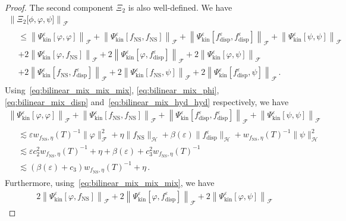 \documentclass[AHL,Unicode,longabstracts,published]{cedram}
\newcommand{\ns}{\mathrm{NS}}
\newcommand{\kin}{\mathrm{kin}}
\newcommand{\disp}{\mathrm{disp}}
\newcommand{\FFF}{\mathscr{F}}
\newcommand{\HHH}{\mathscr{H}}
\newcommand{\SSSs}{\HHH}
\newcommand{\SSSm}{\FFF}
\renewcommand*\le{\leqslant}
\newcommand*\eps{{\varepsilon}}
\begin{document}
\begin{proof}
The second component $\Xi_2$ is also well-defined. We have
\begin{multline*}
\left\| \Xi_2\big[\phi, \varphi, \psi\big] \right\|_{ \SSSm }\\
\begin{aligned}
&\le \left\| \Psi^\eps_\kin\left[\varphi, \varphi \right] \right\|_{ \SSSm } + \left\| \Psi^\eps_\kin\left[f_\ns, f_\ns \right] \right\|_{ \SSSm } + \left\| \Psi^\eps_\kin\left[f^\eps_\disp, f^\eps_\disp\right] \right\|_{ \SSSm }  + \left\| \Psi^\eps_\kin\left[\psi, \psi \right] \right\|_{ \SSSm } \\
& + 2 \left\| \Psi^\eps_\kin\left[\varphi, f_\ns \right] \right\|_{ \SSSm } + 2 \left\| \Psi^\eps_\kin\left[\varphi, f_\disp^\eps \right] \right\|_{ \SSSm } + 2 \left\| \Psi^\eps_\kin\left[\varphi, \psi \right] \right\|_{ \SSSm } \\
& + 2 \left\| \Psi^\eps_\kin\left[f_\ns, f^\eps_\disp \right] \right\|_{ \SSSm } + 2 \left\| \Psi^\eps_\kin\left[f_\ns, \psi \right] \right\|_{ \SSSm } + 2 \left\| \Psi^\eps_\kin\left[f^\eps_\disp, \psi \right] \right\|_{ \SSSm }\,.
\end{aligned}
\end{multline*}
Using~\eqref{eq:bilinear_mix_mix_mix}, \eqref{eq:bilinear_mix_phi}, \eqref{eq:bilinear_mix_disp} and~\eqref{eq:bilinear_mix_hyd_hyd} respectively, we have
\begin{multline*}
\left\| \Psi^\eps_\kin \left[\varphi, \varphi \right] \right\|_{ \SSSm } + \left\| \Psi^\eps_\kin\left[f_\ns, f_\ns \right] \right\|_{ \SSSm } + \left\| \Psi^\eps_\kin\left[f^\eps_\disp, f^\eps_\disp\right] \right\|_{ \SSSm } + \left\| \Psi^\eps_\kin\left[\psi, \psi \right] \right\|_{ \SSSm }
\\
\begin{aligned}
&\lesssim \eps w_{f_\ns, \eta}(T)^{-1}\| \varphi\|_{\SSSm}^2 + \eta \| f_\ns \|_{\SSSs} +\beta(\eps)\| f_\disp^\eps\|_{\SSSs}+w_{f_\ns, \eta}(T)^{-1}\| \psi\|_{\SSSs}^2\\
& \lesssim \eps c_2^2 w_{f_\ns, \eta}(T)^{-1} + \eta + \beta(\eps) + c_3^2 w_{f_\ns, \eta}(T)^{-1} \\
&\lesssim \left(\beta(\eps) + c_3\right) w_{f_\ns, \eta}(T)^{-1} + \eta\,.
\end{aligned}
\end{multline*}
Furthermore, using~\eqref{eq:bilinear_mix_mix_mix}, we have
\begin{multline*}
2 \left\| \Psi^\eps_\kin\left[\varphi, f_\ns\right] \right\|_{ \SSSm } + 2 \left\| \Psi^\eps_\kin\left[\varphi, f_\disp^\eps\right] \right\|_{ \SSSm } + 2 \left\| \Psi^\eps_\kin\left[\varphi, \psi\right]\right\|_{ \SSSm }

\end{multline*}
\end{proof}
\end{document}
